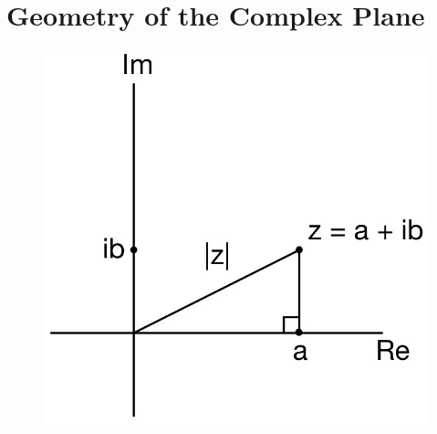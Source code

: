 \documentclass[11pt]{article}
\begin{document}
\newpage
\section{Geometry of the Complex Plane}
\begin{figure}[H]
\includegraphics[scale = 0.19]{1_3}
\centering
\end{figure}
\end{document}

